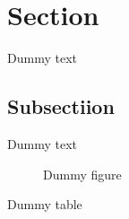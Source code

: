 \documentclass{article}
\begin{document}
\tableofcontents
\newpage

\section{Section}

Dummy text

\subsection{Subsectiion}

Dummy text

\begin{figure}
	\caption{Dummy figure}
\end{figure}

\begin{table}
	\caption{Dummy table}
\end{table}

\begin{appendix}
	\listoffigures
	\listoftables
\end{appendix}
\end{document}
